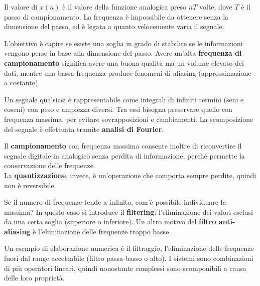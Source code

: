 Il valore di $x(n)$ è il valore della funzione analogica preso $nT$ volte, dove $T$ è il passo di campionamento. La frequenza è impossibile da ottenere senza la dimensione del passo, ed è legata a quanto velocemente varia il segnale. 

L'obiettivo è capire se esiste una soglia in grado di stabilire se le informazioni vengono perse in base alla dimensione del passo. Avere un'alta \textbf{frequenza di campionamento} significa avere una buona qualità ma un volume elevato dei dati, mentre una bassa frequenza produce fenomeni di aliasing (approssimazione a costante).

Un segnale qualsiasi è rappresentabile come integrali di infiniti termini (seni e coseni) con peso e ampiezza diversi. Tra essi bisogna preservare quello con frequenza massima, per evitare sovrapposizioni e cambiamenti. La scomposizione del segnale è effettuata tramite \textbf{analisi di Fourier}. 

Il \textbf{campionamento} con frequenza massima consente inoltre di riconvertire il segnale digitale in analogico senza perdita di informazione, perché permette la conservazione delle frequenze. \\
La \textbf{quantizzazione}, invece, è un'operazione che comporta sempre perdite, quindi non è reversibile. 

Se il numero di frequenze tende a infinito, com'è possibile individuare la massima? In questo caso si introduce il \textbf{filtering}: l'eliminazione dei valori esclusi da una certa soglia (superiore o inferiore). Un altro motivo del \textbf{filtro anti-aliasing} è l'eliminazione delle frequenze troppo basse.

Un esempio di elaborazione numerica è il filtraggio, l'eliminazione delle frequenze fuori dal range accettabile (filtro passa-basso o alto). I sistemi sono combinazioni di più operatori lineari, quindi nonostante complessi sono scomponibili a causa delle loro proprietà.
